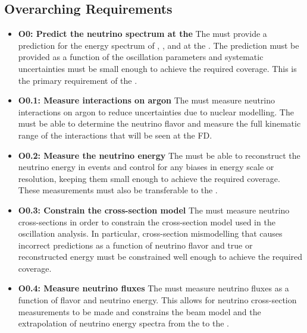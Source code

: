\subsection{Overarching Requirements}

\begin{itemize}
    \item {\bf O0: Predict the neutrino spectrum at the } The  must provide a prediction for the energy spectrum of \numu, \anumu, \nue and \anue at the . The prediction must be provided as a function of the oscillation parameters and systematic uncertainties must be small enough to achieve the required  coverage. This is the primary requirement of the  .
    
    \item{\bf O0.1: Measure interactions on argon} The  must measure neutrino interactions on argon to reduce uncertainties due to nuclear modelling. The  must be able to determine the neutrino flavor and measure the full kinematic range of the interactions that will be seen at the FD.
    
    \item{\bf O0.2: Measure the neutrino energy} The  must be able to reconstruct the neutrino energy in  events and control for any biases in energy scale or resolution, keeping them small enough to achieve the required  coverage. These measurements must also be transferable to the . %
    
    \item{\bf O0.3: Constrain the cross-section model} The  must measure neutrino cross-sections in order to constrain the cross-section model used in the oscillation analysis. In particular, cross-section mismodelling that causes incorrect  predictions as a function of neutrino flavor and true or reconstructed energy must be constrained well enough to achieve the required  coverage. 
    
    \item{\bf O0.4: Measure neutrino fluxes} The  must measure neutrino fluxes as a function of flavor and neutrino energy. This allows for neutrino cross-section measurements to be made and constrains the beam model and the extrapolation of neutrino energy spectra from the  to the .
    

\end{itemize}
